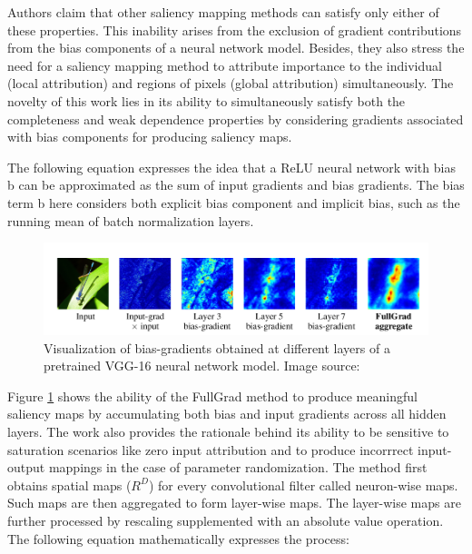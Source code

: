 \documentclass[../report.tex]{subfiles}
\begin{document}
Authors claim that other saliency mapping methods can satisfy only either of these properties. This inability arises from the exclusion of gradient contributions from the bias components of a neural network model. Besides, they also stress the need for a saliency mapping method to attribute importance to the individual (local attribution) and regions of pixels (global attribution) simultaneously. The novelty of this work lies in its ability to simultaneously satisfy both the completeness and weak dependence properties by considering gradients associated with bias components for producing saliency maps.

The following equation expresses the idea that a ReLU neural network with bias b can be approximated as the sum of input gradients and bias gradients. The bias term b here considers both explicit bias component and implicit bias, such as the running mean of batch normalization layers. 
\begin{figure}[H]
	\centering
	\includegraphics[width=\textwidth]{images/chapter3/full_grad.png}
	\caption[Visualization of bias-gradients obtained at different layers of a pretrained VGG-16 neural network model]{Visualization of bias-gradients obtained at different layers of a pretrained VGG-16 neural network model. Image source: \cite{srinivas2019full}}
	\label{fig_fullgrad_op}
\end{figure}
	
Figure \ref{fig_fullgrad_op} shows the ability of the FullGrad method to produce meaningful saliency maps by accumulating both bias and input gradients across all hidden layers. The work also provides the rationale behind its ability to be sensitive to saturation scenarios like zero input attribution and to produce incorrrect input-output mappings in the case of parameter randomization. The method first obtains spatial maps ($R^D$)  for every convolutional filter called neuron-wise maps. Such maps are then aggregated to form layer-wise maps. The layer-wise maps are further processed by rescaling supplemented with an absolute value operation. The following equation mathematically expresses the process: 
\end{document}
